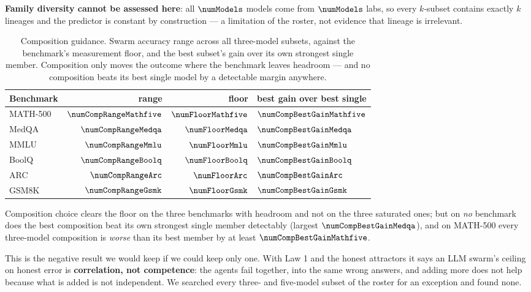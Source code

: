 \textbf{Family diversity cannot be assessed here}: all $\numModels$ models come
from $\numModels$ labs, so every $k$-subset contains exactly $k$ lineages and the
predictor is constant by construction --- a limitation of the roster, not
evidence that lineage is irrelevant.

\begin{table}[t]
\centering
\caption{Composition guidance. Swarm accuracy range across all three-model
subsets, against the benchmark's measurement floor, and the best subset's gain
over its own strongest single member. Composition only moves the outcome where
the benchmark leaves headroom --- and no composition beats its best single model
by a detectable margin anywhere.}
\label{tab:composition}
\small
\begin{tabular}{@{}lrrl@{}}
\toprule
Benchmark & range & floor & best gain over best single \\
\midrule
MATH-500 & $\numCompRangeMathfive$ & $\numFloorMathfive$ & $\numCompBestGainMathfive$ \\
MedQA    & $\numCompRangeMedqa$    & $\numFloorMedqa$    & $\numCompBestGainMedqa$ \\
MMLU     & $\numCompRangeMmlu$     & $\numFloorMmlu$     & $\numCompBestGainMmlu$ \\
BoolQ    & $\numCompRangeBoolq$    & $\numFloorBoolq$    & $\numCompBestGainBoolq$ \\
ARC      & $\numCompRangeArc$      & $\numFloorArc$      & $\numCompBestGainArc$ \\
GSM8K    & $\numCompRangeGsmk$     & $\numFloorGsmk$     & $\numCompBestGainGsmk$ \\
\bottomrule
\end{tabular}
\end{table}

Composition choice clears the floor on the three benchmarks with headroom and not
on the three saturated ones; but on \emph{no} benchmark does the best composition
beat its own strongest single member detectably (largest
$\numCompBestGainMedqa$), and on MATH-500 every three-model composition is
\emph{worse} than its best member by at least $\numCompBestGainMathfive$.

This is the negative result we would keep if we could keep only one. With Law 1
and the honest attractors it says an LLM swarm's ceiling on honest error is
\textbf{correlation, not competence}: the agents fail together, into the same
wrong answers, and adding more does not help because what is added is not
independent. We searched every three- and five-model subset of the roster for an
exception and found none.

